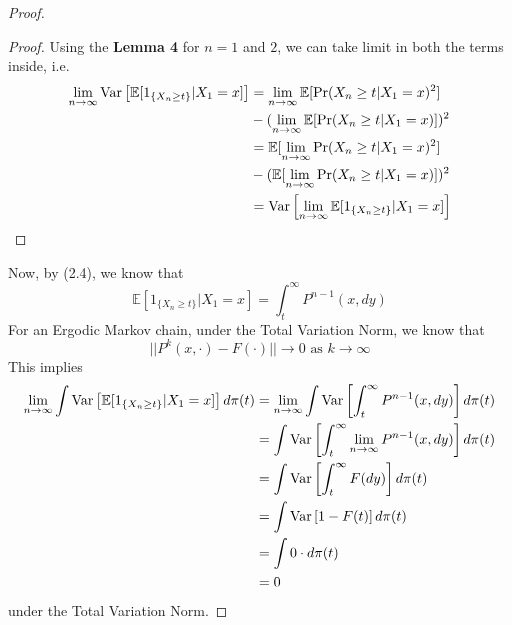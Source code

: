 \begin{theorem}
\begin{proof}
\begin{lem}
\begin{proof}
                Using the \textbf{Lemma 4} for $n = 1$ and $2$, we can take limit in both the terms inside, i.e.
                \begin{align*}
                    \lim_{n \rightarrow \infty} \text{Var}\left[{{\mathbb{E}[1_{\{X_{n} \geq t\}}|X_1=x]}}\right] &= \lim_{n \rightarrow \infty} \mathbb{E}[\Pr(X_{n} \geq t | X_{1} = x)^2]\\
                    &- (\lim_{n \rightarrow \infty} \mathbb{E}[\Pr(X_{n} \geq t | X_{1} = x)])^2\\
                    &= \mathbb{E}[\lim_{n \rightarrow \infty} \Pr(X_{n} \geq t | X_{1} = x)^2]\\
                    &- (\mathbb{E}[\lim_{n \rightarrow \infty}\Pr(X_{n} \geq t | X_{1} = x)])^2\\
                    &= \text{Var}\left[{{\lim_{n \rightarrow \infty} \mathbb{E}[1_{\{X_{n} \geq t\}}|X_1=x]}}\right]
                \end{align*}
            \end{proof}
        \end{lem}
        Now, by (2.4), we know that
        \begin{equation*}
            \mathbb{E}[1_{\{X_{n} \geq t\}}|X_1=x] = \int_t^{\infty} P^{n-1}(x, dy)
        \end{equation*}
        For an Ergodic Markov chain, under the Total Variation Norm, we know that
        \begin{equation*}
            ||P^k(x, \cdot) - F(\cdot)|| \rightarrow 0 \text{ as } k \rightarrow \infty
        \end{equation*}
        This implies
        \begin{align*}
            \lim_{n \rightarrow \infty} \int \text{Var}\left[{{\mathbb{E}[1_{\{X_{n} \geq t\}}|X_1=x]}}\right] d\pi(t) &= \lim_{n \rightarrow \infty} \int \text{Var}\left[{{\int_t^{\infty} P^{n-1}(x, dy)}}\right] d\pi(t)\\
            &= \int \text{Var}\left[{{\int_t^{\infty} \lim_{n \rightarrow \infty} P^{n-1}(x, dy)}}\right] d\pi(t)\\
            &= \int \text{Var}\left[{{\int_t^{\infty} F(dy)}}\right] d\pi(t)\\
            &= \int \text{Var}\left[{{1-F(t)}}\right] d\pi(t)\\
            &= \int 0 \cdot d\pi(t)\\
            &= 0
        \end{align*}
        under the Total Variation Norm.
    \end{proof}
\end{theorem}
